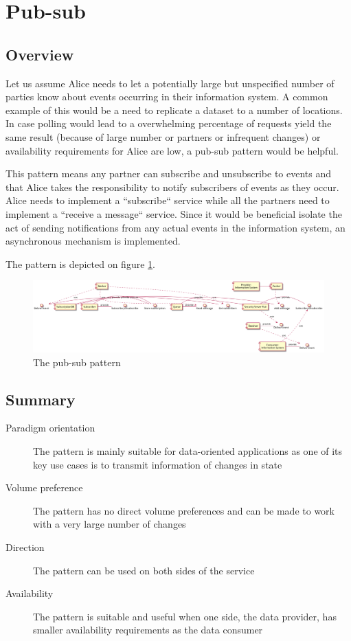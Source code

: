 \documentclass[10pt,a4paper]{article}
\begin{document}
\section{Pub-sub}
\label{sec:p:14}
\subsection{Overview}
Let us assume Alice needs to let a potentially large but unspecified number of parties know about events occurring in their information system. A common example of this would be a need to replicate a dataset to a number of locations. In case polling would lead to a overwhelming percentage of requests yield the same result (because of large number or partners or infrequent changes) or availability requirements for Alice are low, a pub-sub pattern would be helpful. 

This pattern means any partner can subscribe and unsubscribe to events and that Alice takes the responsibility to notify subscribers of events as they occur. Alice needs to implement a ``subscribe`` service while all the partners need to implement a ``receive a message`` service. Since it would be beneficial isolate the act of sending notifications from any actual events in the information system, an asynchronous mechanism is implemented.

The pattern is depicted on figure \ref{fig:p:14}.


\begin{figure}[htp]
	\begin{center}
		\includegraphics[width=1\textwidth]{gfx/14_comp.png}
		\caption{The pub-sub pattern}
		\label{fig:p:14}
	\end{center}
\end{figure}


\subsection{Summary}
\begin{description}
	\item[Paradigm orientation] The pattern is mainly suitable for data-oriented applications as one of its key use cases is to transmit information of changes in state
	\item[Volume preference] The pattern has no direct volume preferences and can be made to work with a very large number of changes
	\item[Direction] The pattern can be used on both sides of the service
	\item[Availability] The pattern is suitable and useful when one side, the data provider, has smaller availability requirements as the data consumer
\end{description}
\end{document}
